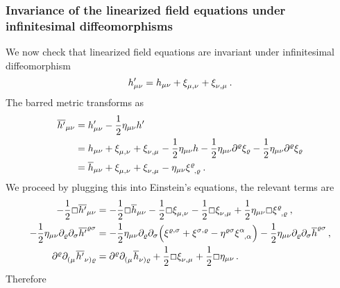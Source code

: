 \subsubsection{Invariance of the linearized field equations under infinitesimal
diffeomorphisms} 
We now check that linearized field equations are invariant under infinitesimal
diffeomorphism
\begin{equation}
    h'_{\mu\nu} = h_{\mu\nu} + \tensor{\xi}{_\mu_,_\nu} +
    \tensor{\xi}{_\nu_,_\mu}\,.
\end{equation}
The barred metric transforms as
\begin{equation}
    \begin{split}
        \overline{h'}_{\mu\nu} &= h'_{\mu\nu} - \frac{1}{2} \eta_{\mu\nu}h' \\
        &= h_{\mu\nu} + \tensor{\xi}{_\mu_,_\nu} + \tensor{\xi}{_\nu_,_\mu} - \frac{1}{2} \eta_{\mu\nu}h
        -\frac{1}{2}\eta_{\mu\nu}\partial^\varrho\xi_\varrho - \frac{1}{2} \eta_{\mu\nu}\partial^\varrho\xi_\varrho \\
        &= \overline{h}_{\mu\nu} + \tensor{\xi}{_\mu_,_\nu} +
        \tensor{\xi}{_\nu_,_\mu} -
        \eta_{\mu\nu}\tensor{\xi}{^\varrho_,_\varrho}\,.
    \end{split}
\end{equation}
We proceed by plugging this into Einstein's equations, the relevant terms are
\begin{align}
    -\frac{1}{2}\Box \overline{h'}_{\mu\nu} &= -\frac{1}{2}\Box\overline{h}_{\mu\nu} - \frac{1}{2}\Box\tensor{\xi}{_\mu_,_\nu}
    -\frac{1}{2}\Box\tensor{\xi}{_\nu_,_\mu} + \frac{1}{2}
    \eta_{\mu\nu}\Box\tensor{\xi}{^\varrho_,_\varrho}\,, \\
    -\frac{1}{2} \eta_{\mu\nu}\partial_\varrho\partial_\sigma \overline{h'}^{\varrho\sigma} &=
    -\frac{1}{2} \eta_{\mu\nu}\partial_\varrho\partial_\sigma \left( \tensor{\xi}{^\varrho^,^\sigma} + \tensor{\xi}{^\sigma^,^\varrho}
    - \eta^{\varrho\sigma} \tensor{\xi}{^\alpha_,_\alpha} \right) - \frac{1}{2}
    \eta_{\mu\nu}\partial_\varrho\partial_\sigma \overline{h}^{\varrho\sigma}\,,
    \\
    \partial^\varrho \tensor{\partial}{_(_\mu} \tensor{\overline{h'}}{_\nu_)_\varrho} &=
    \partial^\varrho \tensor{\partial}{_(_\mu} \tensor{\overline{h}}{_\nu_)_\varrho} + \frac{1}{2}\Box\tensor{\xi}{_\nu_,_\mu}
    + \frac{1}{2}\Box\eta_{\mu\nu}\,.
\end{align}
Therefore
